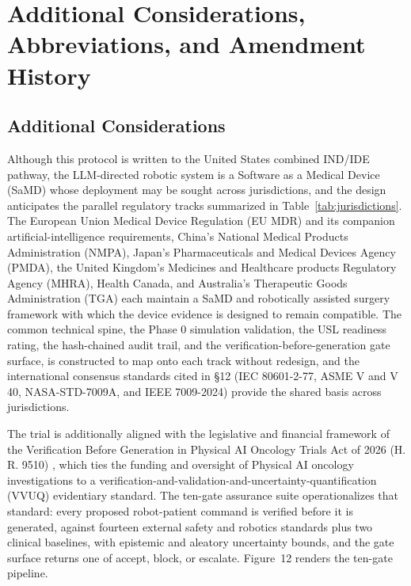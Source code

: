 \section{Additional Considerations, Abbreviations, and Amendment History}

\subsection{Additional Considerations}

Although this protocol is written to the United States combined IND/IDE pathway,
the LLM-directed robotic system is a Software as a Medical Device (SaMD) whose
deployment may be sought across jurisdictions, and the design anticipates the
parallel regulatory tracks summarized in Table~\ref{tab:jurisdictions}. The
European Union Medical Device Regulation (EU MDR) and its companion artificial-intelligence
requirements, China's National Medical Products Administration (NMPA), Japan's
Pharmaceuticals and Medical Devices Agency (PMDA), the United Kingdom's Medicines
and Healthcare products Regulatory Agency (MHRA), Health Canada, and Australia's
Therapeutic Goods Administration (TGA) each maintain a SaMD and robotically
assisted surgery framework with which the device evidence is designed to remain
compatible. The common technical spine, the Phase 0 simulation validation, the USL
readiness rating, the hash-chained audit trail, and the verification-before-generation
gate surface, is constructed to map onto each track without redesign, and the
international consensus standards cited in \S12 (IEC 80601-2-77, ASME V and V 40,
NASA-STD-7009A, and IEEE 7009-2024) provide the shared basis across jurisdictions.

The trial is additionally aligned with the legislative and financial framework of
the Verification Before Generation in Physical AI Oncology Trials Act of 2026 (H.
R. 9510) \cite{kawchak2026hr9510}, which ties the funding and oversight of Physical
AI oncology investigations to a verification-and-validation-and-uncertainty-quantification
(VVUQ) evidentiary standard. The ten-gate assurance suite operationalizes that
standard: every proposed robot-patient command is verified before it is generated,
against fourteen external safety and robotics standards plus two clinical
baselines, with epistemic and aleatory uncertainty bounds, and the gate surface
returns one of accept, block, or escalate. Figure~12 renders the ten-gate
pipeline.

